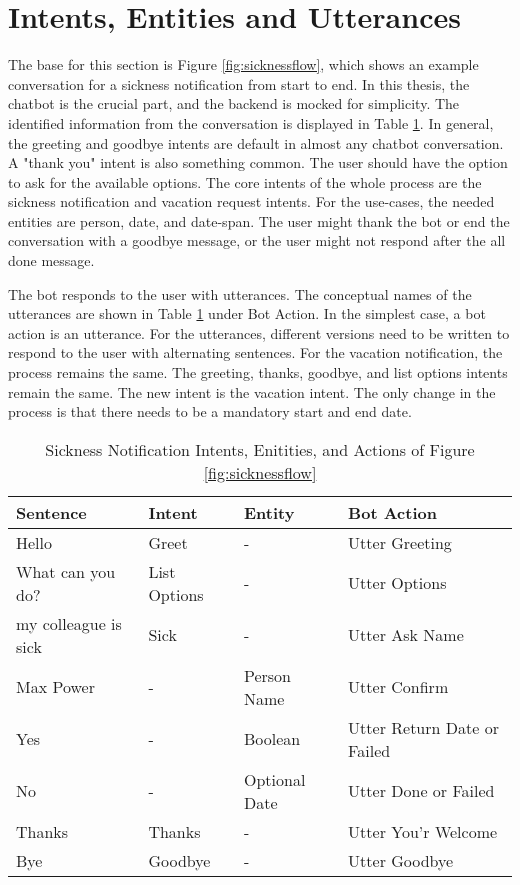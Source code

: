  
 \section{Intents, Entities and Utterances}
The base for this section is Figure \ref{fig:sicknessflow}, which shows an example conversation for a sickness notification from start to end.
 In this thesis, the chatbot is the crucial part, and the backend is mocked for simplicity.
 The identified information from the conversation is displayed in Table \ref{tab:sick_data}.
 In general, the greeting and goodbye intents are default in almost any chatbot conversation.
 A "thank you" intent is also something common.
 The user should have the option to ask for the available options.
 The core intents of the whole process are the sickness notification and vacation request intents.
 For the use-cases, the needed entities are person, date, and date-span.
 The user might thank the bot or end the conversation with a goodbye message, or the user might not respond after the all done message.



The bot responds to the user with utterances.
The conceptual names of the utterances are shown in Table \ref{tab:sick_data} under Bot Action.
In the simplest case, a bot action is an utterance.
For the utterances, different versions need to be written to respond to the user with alternating sentences.
For the vacation notification, the process remains the same.
The greeting, thanks, goodbye, and list options intents remain the same.
The new intent is the vacation intent.
The only change in the process is that there needs to be a mandatory start and end date.

 \begin{table}[h]
    \centering
    \begin{tabular}{ l | l | l | l }
        Sentence & Intent & Entity & Bot Action \\ \hline \hline
        Hello & Greet & - & Utter Greeting \\ \hline
        What can you do? & List Options & - & Utter Options \\ \hline
        my colleague is sick & Sick & - & Utter Ask Name \\ \hline
        Max Power & - & Person Name & Utter Confirm \\ \hline
        Yes & - & Boolean & Utter Return Date or Failed \\ \hline
        No & - & Optional Date & Utter Done or Failed \\ \hline
        Thanks & Thanks & - & Utter You'r Welcome \\ \hline
        Bye & Goodbye & - & Utter Goodbye 
    \end{tabular}
    \caption{Sickness Notification Intents, Enitities, and Actions of Figure \ref{fig:sicknessflow}} \label{tab:sick_data}
\end{table} \noindent

